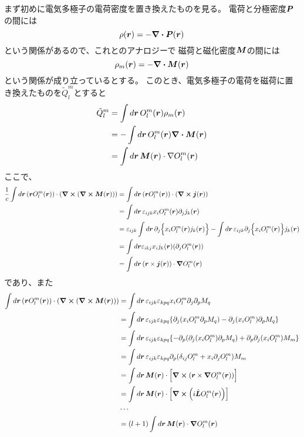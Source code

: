 \documentclass[../../master.tex]{subfiles}
\begin{document}
まず初めに電気多極子の電荷密度を置き換えたものを見る。
電荷と分極密度\(\vb*{P}\)の間には
\begin{equation}
    \rho(\vb*{r}) = -\div\vb*{P}(\vb*{r})
\end{equation}
という関係があるので、これとのアナロジーで
磁荷と磁化密度\(\vb*{M}\)の間には
\begin{equation}
    \rho_m(\vb*{r}) = -\div\vb*{M}(\vb*{r})
\end{equation}
という関係が成り立っているとする。
このとき、電気多極子の電荷を磁荷に置き換えたものを\(\tilde{Q}_l^m\)とすると
\begin{align}
    \tilde{Q}_l^m
    &= \int d\vb*{r}\, O_l^m(\vb*{r})\rho_m(\vb*{r})\\
    &= -\int d\vb*{r}\, O_l^m(\vb*{r})\div\vb*{M}(\vb*{r})\\
    &= \int d\vb*{r}\, \vb*{M}(\vb*{r})\cdot \nabla O_l^m(\vb*{r})
\end{align}
ここで、
\begin{align}
    \frac{1}{c}\int d\vb*{r}\, (\vb*{r}O_l^m(\vb*{r}))\cdot(\curl (\curl\vb*{M}(\vb*{r})))
    &=\int d\vb*{r}\, (\vb*{r}O_l^m(\vb*{r}))\cdot(\curl \vb*{j}(\vb*{r}))\\
    &=\int d\vb*{r}\, \varepsilon_{ijk} x_i O_l^m(\vb*{r}) \partial_j j_k(\vb*{r})\\
    &=\varepsilon_{ijk} \int d\vb*{r}\, \partial_j \Bigl\{ x_i O_l^m(\vb*{r}) j_k(\vb*{r})\Bigr\}
    - \int d\vb*{r}\, \varepsilon_{ijk}\partial_j\Bigl\{x_i O_l^m(\vb*{r})\Bigr\} j_k(\vb*{r})\\
    &=\int d\vb*{r}\varepsilon_{ikj} x_i j_k(\vb*{r}) (\partial_j O_l^m(\vb*{r}))\\
    &=\int d\vb*{r}\, (\vb*{r}\times\vb*{j}(\vb*{r}))\cdot \grad O_l^m(\vb*{r})
\end{align}
であり、また
\begin{align}
    \int d\vb*{r}\, (\vb*{r}O_l^m(\vb*{r}))\cdot(\curl (\curl\vb*{M}(\vb*{r})))
    &=\int d\vb*{r}\, \varepsilon_{ijk}\varepsilon_{kpq} x_i O_l^m \partial_j \partial_p M_q\\
    &=\int d\vb*{r}\, \varepsilon_{ijk}\varepsilon_{kpq}
    \qty{\partial_j(x_i O_l^m \partial_p M_q)-\partial_j(x_i O_l^m)\partial_p M_q}\\
    &=\int d\vb*{r}\, \varepsilon_{ijk}\varepsilon_{kpq}
    \qty{-\partial_p(\partial_j(x_i O_l^m)\partial_p M_q)+ \partial_p\partial_j(x_iO_l^m)M_m}\\
    &=\int d\vb*{r}\, \varepsilon_{ijk}\varepsilon_{kpq}
    \partial_p(\delta_{ij}O_l^m + x_i\partial_jO_l^m)M_m\\
    &= \int d\vb*{r}\, \vb*{M}(\vb*{r})\cdot\Bigl[
        \curl (\vb*{r}\times \grad O_l^m(\vb*{r}))
    \Bigr]\\
    &= \int d\vb*{r}\, \vb*{M}(\vb*{r})\cdot\Bigl[
        \curl (i\hat{\vb*{L}}O_l^m(\vb*{r}))
    \Bigr]\\
    & \cdots \notag\\
    &= (l+1)\int d\vb*{r}\, \vb*{M}(\vb*{r})\cdot\grad O_l^m(\vb*{r})
\end{align}
\end{document}
